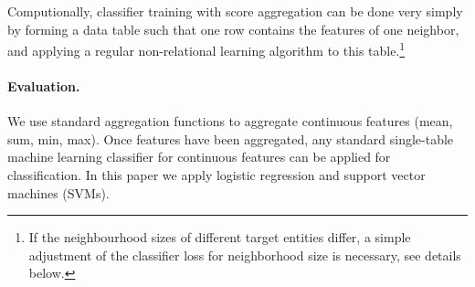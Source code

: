 \documentclass[oribibl]{llncs}%
\begin{document}

Computionally, classifier training with score aggregation can be done very simply by forming a data table such that one row contains the features of one neighbor, and applying a regular non-relational learning algorithm to this table.\footnote{If the neighbourhood sizes of different target entities differ, a simple adjustment of the classifier loss for neighborhood size is necessary, see details below.} 


\paragraph{Evaluation.}
We use standard aggregation functions to aggregate continuous features (mean, sum, min, max). Once features have been aggregated, any standard single-table machine learning classifier for continuous features can be applied for classification. In this paper we apply logistic regression and support vector machines (SVMs). 
\end{document}
